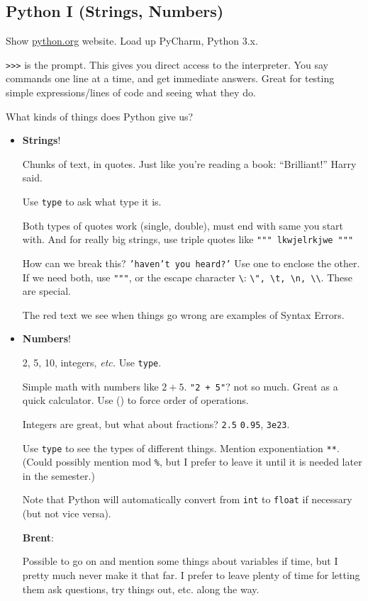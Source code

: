 \documentclass{article}
\newcommand{\etc}{\emph{etc.}\xspace}
\newenvironment{reflect}[1]
{
  \noindent
  \begin{lrbox}{\reflectbox}
    \begin{minipage}[t]{\textwidth}
      \textbf{#1}:
}{
    \end{minipage}
  \end{lrbox}
  \fbox{\usebox{\reflectbox}}
}
\begin{document}
\subsection*{Python I (Strings, Numbers)}

Show \url{python.org} website.  Load up PyCharm, Python 3.x.

\texttt{>>>} is the prompt.  This gives you direct access to the
interpreter.  You say commands one line at a time, and get immediate
answers.  Great for testing simple expressions/lines of code and
seeing what they do.

What kinds of things does Python give us?

\begin{itemize}
\item \textbf{Strings}!

  Chunks of text, in quotes. Just like you're reading a book:
  ``Brilliant!'' Harry said.

  Use \texttt{type} to ask what type it is.

  Both types of quotes work (single, double), must end with same you
  start with. And for really big strings, use triple quotes like
  \texttt{""" lkwjelrkjwe """}

  How can we break this? \texttt{'haven't you heard?'}  Use one to
  enclose the other.  If we need both, use \texttt{"""}, or the escape
  character \texttt{\textbackslash}: \texttt{\textbackslash ", \textbackslash t,
    \textbackslash n, \textbackslash\textbackslash}. These are special.

  The red text we see when things go wrong are examples of Syntax
  Errors.

\item \textbf{Numbers}!

  2, 5, 10, integers, \etc  Use \texttt{type}.

  Simple math with numbers like $2+5$. \texttt{"2 + 5"}? not so much.
  Great as a quick calculator. Use () to force order of operations.

  Integers are great, but what about fractions? \texttt{2.5}
  \texttt{0.95}, \texttt{3e23}.

  Use \verb|type| to see the types of different things.  Mention
  exponentiation \verb|**|. (Could possibly mention mod \verb|%|, but
  I prefer to leave it until it is needed later in the semester.)

  Note that Python will automatically convert from \verb|int| to
  \verb|float| if necessary (but not vice versa).

  \begin{reflect}{Brent}
    Possible to go on and mention some things about variables if time,
    but I pretty much never make it that far.  I prefer to leave
    plenty of time for letting them ask questions, try things out,
    etc. along the way.
  \end{reflect}
\end{itemize}
\end{document}
